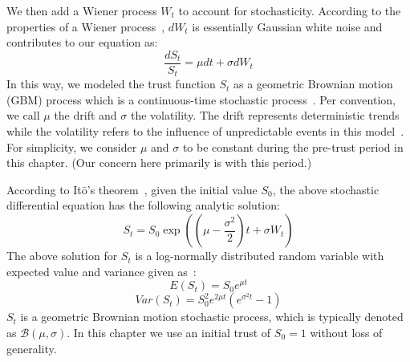 We then add a Wiener process $W_t$ to account for stochasticity.
According to the properties of a Wiener process~\cite{oksendal2003stochastic},
$dW_t$ is essentially Gaussian white noise and contributes to our
equation as:
\begin{equation}\frac{d S_t}{S_t} = \mu {dt}+\sigma dW_t\end{equation}
In this way, we modeled the trust function $S_t$ as a geometric Brownian motion (GBM) process which is a continuous-time stochastic process~\cite{oksendal2003stochastic}. Per convention, we call $\mu$ the drift and $\sigma$ the volatility. The drift represents deterministic trends while the volatility refers to the influence of unpredictable events in this model~\cite{wiersema2008brownian}. For simplicity, we consider $\mu$ and $\sigma$ to be constant during the pre-trust period in this chapter. (Our concern here primarily is with this period.)


According to It\={o}'s theorem~\cite{oksendal2003stochastic}, given the initial value $S_0$,
the above stochastic differential equation has the following analytic solution:
\begin{equation}
S_{t}=S_{0}\exp \left(\left(\mu -{\frac  {\sigma ^{2}}{2}}\right)t+\sigma W_{t}\right)
\end{equation}
The above solution for $S_{t}$ is a log-normally distributed random variable with expected value and variance given as~\cite{oksendal2003stochastic}:
\begin{equation}
{  {E}}(S_{t})=S_0e^{{\mu t}}
\end{equation}
\vspace{-1em}
\begin{equation}
 {Var}(S_{t})=S_0^2e^{{2\mu t}}\left(e^{{\sigma ^{2}t}}-1\right)
\end{equation} $S_t$ is a geometric Brownian motion stochastic process, which is typically denoted as $\mathcal{B}(\mu,\sigma)$.
In this chapter we use an initial trust of $S_0 = 1$ without loss of generality.



